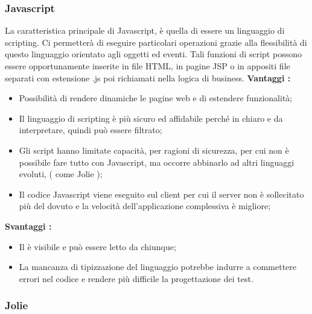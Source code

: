 {{		\subsubsection{Javascript}{
			La caratteristica principale di Javascript, è quella di essere un linguaggio di scripting. Ci permetterà di eseguire particolari operazioni grazie alla flessibilità di questo linguaggio orientato agli oggetti ed eventi. Tali funzioni di script possono essere opportunamente inserite in file HTML, in pagine JSP o in appositi file separati con estensione .js poi richiamati nella logica di business.
			\textbf{Vantaggi :}
			\begin{itemize}\itemsep1pt
				\item Possibilità di rendere dinamiche le pagine web e di estendere funzionalità;
				\item Il linguaggio di scripting è più sicuro ed affidabile perché in chiaro e da interpretare, quindi può essere filtrato;
				\item Gli script hanno limitate capacità, per ragioni di sicurezza, per cui non è possibile fare tutto con Javascript, ma occorre abbinarlo ad altri linguaggi evoluti, ( come Jolie );
				\item Il codice Javascript viene eseguito sul client per cui il server non è sollecitato più del dovuto e la velocità dell'applicazione complessiva è migliore;
			\end{itemize}
			\textbf{Svantaggi :}
			\begin{itemize}\itemsep1pt
				\item Il è visibile e può essere letto da chiunque;
				\item La mancanza di tipizzazione del linguaggio potrebbe indurre a commettere errori nel codice e rendere più difficile la progettazione dei test.
			\end{itemize}
		}
		\subsubsection{Jolie}{
		}
	}
}
